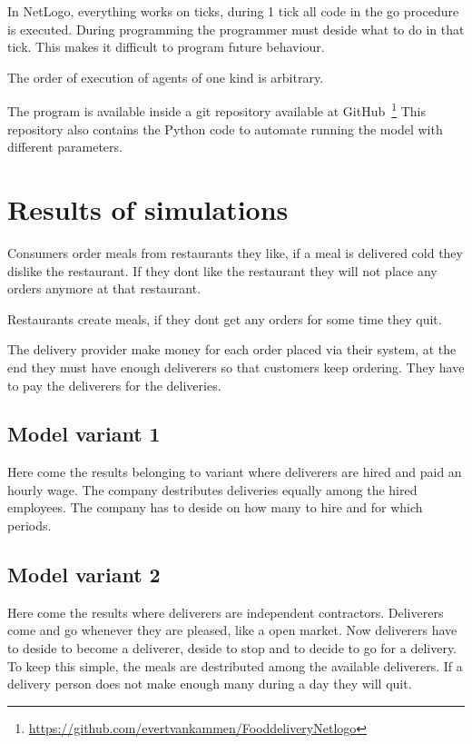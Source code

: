 In NetLogo, everything works on ticks, during 1 tick all code in the go procedure is executed.
During programming the programmer must deside what to do in that tick.
This makes it difficult to program future behaviour.

The order of execution of agents of one kind is arbitrary.

The program is available inside a git repository available at GitHub~\footnote{\url{https://github.com/evertvankammen/FooddeliveryNetlogo}}
This repository also contains the Python code to automate running the model with different parameters.

\section{Results of simulations}\label{sec:results-of-simulations}
Consumers order meals from restaurants they like, if a meal is delivered cold they dislike the restaurant.
If they dont like the restaurant they will not place any orders anymore at that restaurant.

Restaurants create meals, if they dont get any orders for some time they quit.

The delivery provider make money for each order placed via their system, at the end they must have enough deliverers so that
customers keep ordering.
They have to pay the deliverers for the deliveries.



\subsection{Model variant 1}
Here come the results belonging to variant where deliverers are hired and paid an hourly wage.
The company destributes deliveries equally among the hired employees.
The company has to deside on how many to hire and for which periods.


\subsection{Model variant 2}
Here come the results where deliverers are independent contractors.
Deliverers come and go whenever they are pleased, like a open market.
Now deliverers have to deside to become a deliverer, deside to stop and to decide to go for a delivery.
To keep this simple, the meals are destributed among the available deliverers.
If a delivery person does not make enough many during a day they will quit.
